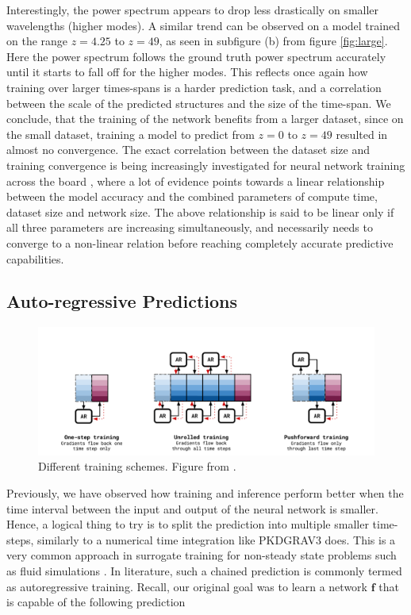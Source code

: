 \documentclass{article}
\begin{document}
Interestingly, the power spectrum appears to drop less drastically on smaller wavelengths (higher modes). A similar trend can be observed on a model trained on the range $z=4.25$ to $z=49$, as seen in subfigure (b) from figure \ref{fig:large}. Here the power spectrum follows the ground truth power spectrum accurately until it starts to fall off for the higher modes. This reflects once again how training over larger times-spans is a harder prediction task, and a correlation between the scale of the predicted structures and the size of the time-span. We conclude, that the training of the network benefits from a larger dataset, since on the small dataset, training a model to predict from $z=0$ to $z=49$ resulted in almost no convergence. The exact correlation between the dataset size and training convergence is being increasingly investigated for neural network training across the board \citep{kaplan2020scaling}, where a lot of evidence points towards a linear relationship between the model accuracy and the combined parameters of compute time, dataset size and network size. The above relationship is said to be linear only if all three parameters are increasing simultaneously, and necessarily needs to converge to a non-linear relation before reaching completely accurate predictive capabilities.


\subsection{Auto-regressive Predictions}

\begin{figure}[h]
    \centering
    \includegraphics[width=0.75\linewidth]{img/schemes.png}
    \caption{Different training schemes. Figure from \cite {brandstetter2022message}.}
    \label{fig:enter-label}
\end{figure}

Previously, we have observed how training and inference perform better when the time interval between the input and output of the neural network is smaller. Hence, a logical thing to try is to split the prediction into multiple smaller time-steps, similarly to a numerical time integration like PKDGRAV3 does. This is a very common approach in surrogate training for non-steady state problems such as fluid simulations \citep{li2020fourier}. In literature, such a chained prediction is commonly termed as autoregressive training. Recall, our original goal was to learn a network $\mathbf{f}$ that is capable of the following prediction
\end{document}
